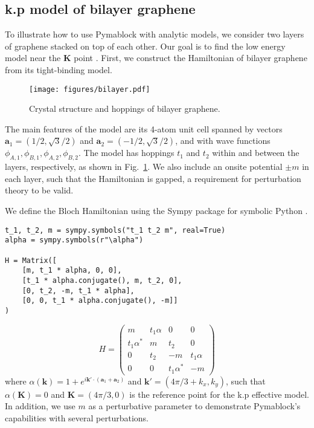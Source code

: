 \subsection{k.p model of bilayer graphene}


To illustrate how to use Pymablock with analytic models, we consider two layers
of graphene stacked on top of each other.
Our goal is to find the low energy model near the $\mathbf{K}$ point
\cite{McCann_2013}.
First, we construct the Hamiltonian of bilayer graphene from its tight-binding
model.
%
\begin{figure}[!htbp]
\centering
\texttt{[image: figures/bilayer.pdf]}
\caption[]{Crystal structure and hoppings of bilayer graphene.}
\label{fig:bilayer}
\end{figure}
%
The main features of the model are its 4-atom unit cell spanned by vectors
$\mathbf{a}_1 = (1/2, \sqrt{3}/2)$ and $\mathbf{a}_2=( -1/2, \sqrt{3}/2)$,
and with wave functions $\phi_{A,1}, \phi_{B,1}, \phi_{A,2}, \phi_{B,2}$.
The model has hoppings $t_1$ and $t_2$ within and between the layers,
respectively, as shown in Fig.~\ref{fig:bilayer}.
We also include an onsite potential $\pm m$ in each layer, such that the
Hamiltonian is gapped, a requirement for perturbation theory to be valid.

We define the Bloch Hamiltonian using the Sympy package for symbolic Python
\cite{Meurer_2017}.
%
\begin{verbatim}
t_1, t_2, m = sympy.symbols("t_1 t_2 m", real=True)
alpha = sympy.symbols(r"\alpha")

H = Matrix([
    [m, t_1 * alpha, 0, 0],
    [t_1 * alpha.conjugate(), m, t_2, 0],
    [0, t_2, -m, t_1 * alpha],
    [0, 0, t_1 * alpha.conjugate(), -m]]
)
\end{verbatim}

$$
H =
\begin{pmatrix}
m & t_1 \alpha & 0 & 0\\
t_1 \alpha^{*} & m & t_2 & 0\\
0 & t_2 & -m & t_1 \alpha\\
0 & 0 & t_1 \alpha^{*} & -m
\end{pmatrix}
$$
%
where $\alpha(\mathbf{k}) = 1 + e^{i \mathbf{k'} \cdot (\mathbf{a}_1 +
\mathbf{a}_2)}$ and $\mathbf{k'} = (4\pi/3 + k_x, k_y)$, such that
$\alpha(\mathbf{K}) = 0$ and $\mathbf{K}=(4\pi/3, 0)$ is the reference point
for the k.p effective model.
In addition, we use $m$ as a perturbative parameter to demonstrate Pymablock's
capabilities with several perturbations.

